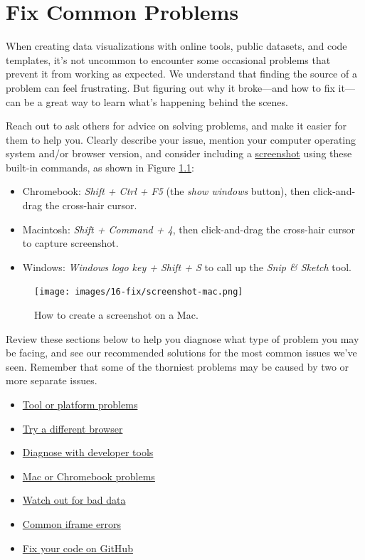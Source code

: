 \documentclass[
  english,
]{book}
\providecommand{\tightlist}{%
  \setlength{\itemsep}{0pt}\setlength{\parskip}{0pt}}
\begin{document}
\hypertarget{appendix-appendix}{%
\appendix}


\hypertarget{fix}{%
\chapter{Fix Common Problems}\label{fix}}

When creating data visualizations with online tools, public datasets, and code templates, it's not uncommon to encounter some occasional problems that prevent it from working as expected. We understand that finding the source of a problem can feel frustrating. But figuring out why it broke---and how to fix it---can be a great way to learn what's happening behind the scenes.

Reach out to ask others for advice on solving problems, and make it easier for them to help you. Clearly describe your issue, mention your computer operating system and/or browser version, and consider including a \href{https://en.wikipedia.org/wiki/Screenshot}{screenshot} using these built-in commands, as shown in Figure \ref{fig:screenshot-mac}:

\begin{itemize}
\tightlist
\item
  Chromebook: \emph{Shift + Ctrl + F5} (the \emph{show windows} button), then click-and-drag the cross-hair cursor.
\item
  Macintosh: \emph{Shift + Command + 4}, then click-and-drag the cross-hair cursor to capture screenshot.
\item
  Windows: \emph{Windows logo key + Shift + S} to call up the \emph{Snip \& Sketch} tool.
\end{itemize}



\begin{figure}
\centering
\texttt{[image: images/16-fix/screenshot-mac.png]}
\caption{\label{fig:screenshot-mac}How to create a screenshot on a Mac.}
\end{figure}

Review these sections below to help you diagnose what type of problem you may be facing, and see our recommended solutions for the most common issues we've seen. Remember that some of the thorniest problems may be caused by two or more separate issues.

\begin{itemize}
\tightlist
\item
  \href{fix-tool.html}{Tool or platform problems}
\item
  \href{fix-browser.html}{Try a different browser}
\item
  \href{fix-developer-tools.html}{Diagnose with developer tools}
\item
  \href{fix-computer.html}{Mac or Chromebook problems}
\item
  \href{fix-data.html}{Watch out for bad data}
\item
  \href{fix-iframe.html}{Common iframe errors}
\item
  \href{fix-code.html}{Fix your code on GitHub}
\end{itemize}
\end{document}
